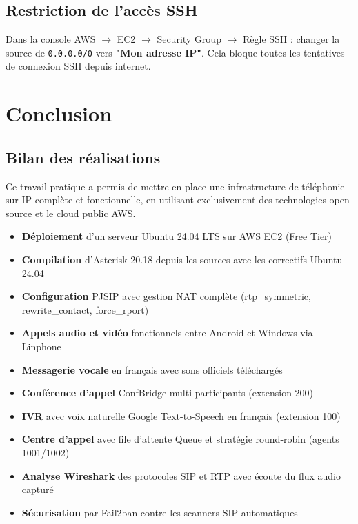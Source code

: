 \documentclass[a4paper,11pt]{report}
\begin{document}
\section{Restriction de l'accès SSH}

Dans la console AWS $\to$ EC2 $\to$ Security Group $\to$ Règle SSH : changer la source de \texttt{0.0.0.0/0} vers \textbf{"Mon adresse IP"}. Cela bloque toutes les tentatives de connexion SSH depuis internet.

\chapter{Conclusion}

\section{Bilan des réalisations}

Ce travail pratique a permis de mettre en place une infrastructure de téléphonie sur IP complète et fonctionnelle, en utilisant exclusivement des technologies open-source et le cloud public AWS.

\begin{successbox}
\begin{itemize}[leftmargin=1.2em, itemsep=3pt]
  \item \textbf{Déploiement} d'un serveur Ubuntu 24.04 LTS sur AWS EC2 (Free Tier)
  \item \textbf{Compilation} d'Asterisk 20.18 depuis les sources avec les correctifs Ubuntu 24.04
  \item \textbf{Configuration} PJSIP avec gestion NAT complète (rtp\_symmetric, rewrite\_contact, force\_rport)
  \item \textbf{Appels audio et vidéo} fonctionnels entre Android et Windows via Linphone
  \item \textbf{Messagerie vocale} en français avec sons officiels téléchargés
  \item \textbf{Conférence d'appel} ConfBridge multi-participants (extension 200)
  \item \textbf{IVR} avec voix naturelle Google Text-to-Speech en français (extension 100)
  \item \textbf{Centre d'appel} avec file d'attente Queue et stratégie round-robin (agents 1001/1002)
  \item \textbf{Analyse Wireshark} des protocoles SIP et RTP avec écoute du flux audio capturé
  \item \textbf{Sécurisation} par Fail2ban contre les scanners SIP automatiques
\end{itemize}
\end{successbox}
\end{document}
